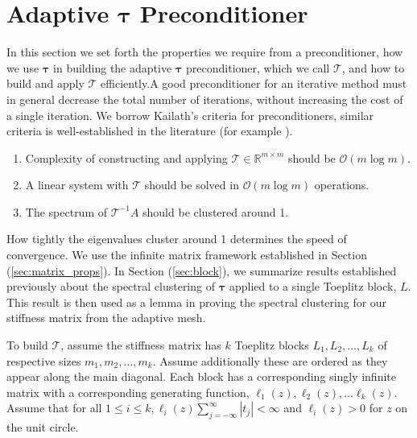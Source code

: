 \documentclass[review]{siamart251216}
\newcommand{\R}{{\mathbb{R}}}
\newcommand{\bigOh}{\mathcal{O}}
\newcommand{\A}{{A }}
\newcommand{\Toe}{{ L }}
\newcommand{\toe}{{ \ell }}
\newcommand{\Tau}{\mathcal{T}}
\newcommand{\ptau}{{\bm{\tau}}}
\begin{document}
\section{Adaptive \texorpdfstring{$\ptau$}{tau} Preconditioner} \label{precond} 
In this section we set forth the properties we require from a preconditioner, how we use $\ptau$ in building the adaptive $\ptau$ preconditioner, which we call $\Tau$, and how to build and apply $\Tau$ efficiently.A good preconditioner for an iterative method must in general decrease the total number of iterations, without increasing the cost of a single iteration. We borrow Kailath's \cite{Kailath} criteria for preconditioners, similar criteria is well-established in the literature (for example \cite{Bini}). 
\begin{enumerate} 
	\item Complexity of constructing and applying $\Tau \in \R^{m \times m}$ should be $\bigOh (m \log m)$. \label{crit1}
	\item A linear system with $\Tau$ should be solved in $ \bigOh (m \log m)$ operations. \label{crit2}
	\item The spectrum of $\Tau^{-1} \A$ should be clustered around 1. \label{crit3}
\end{enumerate}

How tightly the eigenvalues cluster around 1 determines the speed of convergence. 
We use the infinite matrix framework established in Section (\ref{sec:matrix_props}). In Section (\ref{sec:block}), we summarize results established previously about the spectral clustering of $\ptau$ applied to a single Toeplitz block, $\Toe$. This result is then used as a lemma in proving the spectral clustering for our stiffness matrix from the adaptive mesh. 

%

To build $\Tau$, assume the stiffness matrix has $k$ Toeplitz blocks $\Toe_1, \Toe_2, \dots, \Toe_k$ of respective sizes $m_1, m_2, \dots, m_k$. Assume additionally these are ordered as they appear along the main diagonal. Each block has a corresponding singly infinite matrix with a corresponding generating function, $\toe_1(z), \toe_2(z), \dots \toe_k(z)$. Assume that for all $1 \leq i \leq k, \toe_i(z)  \sum_{j=-\infty}^{\infty} |t_j| <\infty$ and $\toe_i(z) > 0$ for $z$ on the unit circle. 
\end{document}
